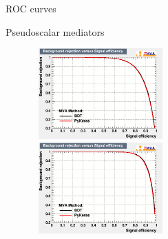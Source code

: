 \documentclass[8pt]{beamer}
\begin{document}
\begin{frame}{ROC curves}
\vspace{-5pt}
\begin{block}{\centering Pseudoscalar mediators}\end{block} \vspace{-10pt}
\begin{figure}[htbp]
\centering
\begin{minipage}[b]{.49\textwidth}
\begin{center}
\includegraphics[width=5.2cm, height=3.5cm]{figs/ROC_pseudo100.png}
\end{center}
\end{minipage}\hfill
\begin{minipage}[b]{.49\textwidth}
\begin{center}
\includegraphics[width=5.2cm, height=3.5cm]{figs/ROC_pseudo500.png}
\end{center}
\end{minipage} \hfill
\end{figure} \vfill
\end{frame}
\end{document}
